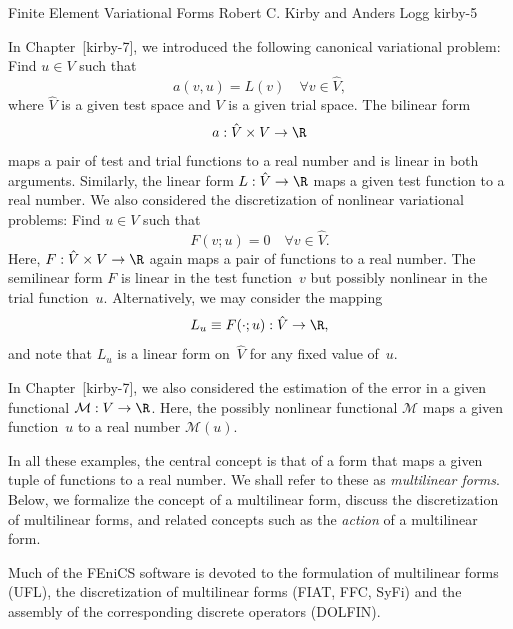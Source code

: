               {Finite Element Variational Forms}
              {Robert C. Kirby and Anders Logg}
              {kirby-5}

In Chapter~[kirby-7], we introduced the following canonical
variational problem: Find $u \in V$ such that
\begin{equation} \label{eq:kirby5:canonical}
  a(v, u) = L(v) \quad \forall v \in \hat{V},
\end{equation}
where $\hat{V}$ is a given test space and $V$ is a given trial space.
The bilinear form
\begin{displaymath}
  a: \hat{V} \times V \rightarrow \R
\end{displaymath}
maps a pair of test and trial functions to a real number and is linear
in both arguments. Similarly, the linear form $L: \hat{V} \rightarrow
\R$ maps a given test function to a real number. We also considered
the discretization of nonlinear variational problems: Find $u \in V$
such that
\begin{displaymath}
  F(v; u) = 0 \quad \forall v \in \hat{V}.
\end{displaymath}
Here, $F: \hat{V} \times V \rightarrow \R$ again maps a pair of
functions to a real number. The semilinear form $F$ is linear in the
test function~$v$ but possibly nonlinear in the trial
function~$u$. Alternatively, we may consider the mapping
\begin{displaymath}
  L_u \equiv F(\cdot; u) : \hat{V} \rightarrow \R,
\end{displaymath}
and note that $L_u$ is a linear form on~$\hat{V}$ for any fixed value
of~$u$.

In Chapter~[kirby-7], we also considered the estimation of the error
in a given functional $\mathcal{M} : V \rightarrow \R$. Here, the
possibly nonlinear functional $\mathcal{M}$ maps a given function~$u$
to a real number $\mathcal{M}(u)$.

In all these examples, the central concept is that of a form that maps
a given tuple of functions to a real number. We shall refer to these
as \emph{multilinear forms}. Below, we formalize the concept of a
multilinear form, discuss the discretization of multilinear forms, and
related concepts such as the \emph{action} of a multilinear form.

Much of the FEniCS software is devoted to the formulation of
multilinear forms (UFL), the discretization of multilinear forms
(FIAT, FFC, SyFi) and the assembly of the corresponding discrete
operators (DOLFIN).

